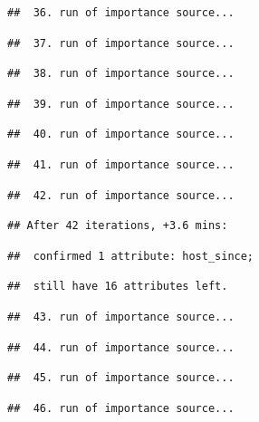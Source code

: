 \documentclass[
]{article}
\begin{document}
\begin{verbatim}
##  36. run of importance source...
\end{verbatim}

\begin{verbatim}
##  37. run of importance source...
\end{verbatim}

\begin{verbatim}
##  38. run of importance source...
\end{verbatim}

\begin{verbatim}
##  39. run of importance source...
\end{verbatim}

\begin{verbatim}
##  40. run of importance source...
\end{verbatim}

\begin{verbatim}
##  41. run of importance source...
\end{verbatim}

\begin{verbatim}
##  42. run of importance source...
\end{verbatim}

\begin{verbatim}
## After 42 iterations, +3.6 mins:
\end{verbatim}

\begin{verbatim}
##  confirmed 1 attribute: host_since;
\end{verbatim}

\begin{verbatim}
##  still have 16 attributes left.
\end{verbatim}

\begin{verbatim}
##  43. run of importance source...
\end{verbatim}

\begin{verbatim}
##  44. run of importance source...
\end{verbatim}

\begin{verbatim}
##  45. run of importance source...
\end{verbatim}

\begin{verbatim}
##  46. run of importance source...
\end{verbatim}
\end{document}
